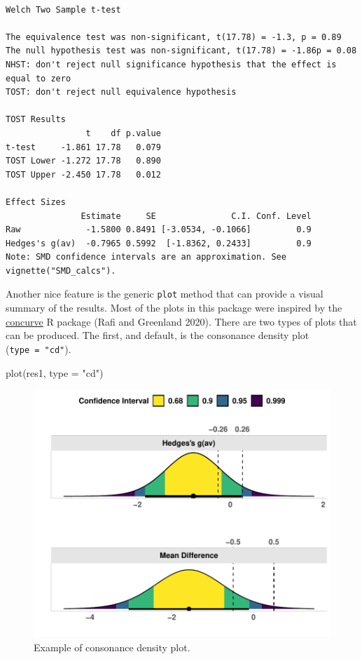 \documentclass[
]{interact}
\newenvironment{Shaded}{\begin{snugshade}}{\end{snugshade}}
\newcommand{\AttributeTok}[1]{\textcolor[rgb]{0.40,0.45,0.13}{#1}}
\newcommand{\FunctionTok}[1]{\textcolor[rgb]{0.28,0.35,0.67}{#1}}
\newcommand{\NormalTok}[1]{\textcolor[rgb]{0.00,0.23,0.31}{#1}}
\newcommand{\StringTok}[1]{\textcolor[rgb]{0.13,0.47,0.30}{#1}}
\begin{document}
\begin{verbatim}

Welch Two Sample t-test

The equivalence test was non-significant, t(17.78) = -1.3, p = 0.89
The null hypothesis test was non-significant, t(17.78) = -1.86p = 0.08
NHST: don't reject null significance hypothesis that the effect is equal to zero 
TOST: don't reject null equivalence hypothesis

TOST Results 
                t    df p.value
t-test     -1.861 17.78   0.079
TOST Lower -1.272 17.78   0.890
TOST Upper -2.450 17.78   0.012

Effect Sizes 
               Estimate     SE               C.I. Conf. Level
Raw             -1.5800 0.8491 [-3.0534, -0.1066]         0.9
Hedges's g(av)  -0.7965 0.5992  [-1.8362, 0.2433]         0.9
Note: SMD confidence intervals are an approximation. See vignette("SMD_calcs").
\end{verbatim}

\newpage

Another nice feature is the generic \texttt{plot} method that can
provide a visual summary of the results. Most of the plots in this
package were inspired by the
\href{https://cran.r-project.org/package=concurve}{concurve} R package
(Rafi and Greenland 2020). There are two types of plots that can be
produced. The first, and default, is the consonance density plot
(\texttt{type\ =\ "cd"}).

\begin{Shaded}
\begin{Highlighting}[]
\FunctionTok{plot}\NormalTok{(res1, }\AttributeTok{type =} \StringTok{"cd"}\NormalTok{)}
\end{Highlighting}
\end{Shaded}

\begin{figure}[H]

{\centering \includegraphics{avocado-quarto_files/figure-pdf/cdplot-1.pdf}

}

\caption{Example of consonance density plot.}

\end{figure}
\end{document}

